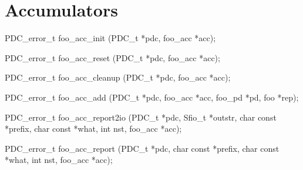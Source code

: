 \chapter{Accumulators}
\label{chap:accumulators}
\begin{code}
PDC_error_t foo_acc_init (PDC_t *pdc, foo_acc *acc);

PDC_error_t foo_acc_reset (PDC_t *pdc, foo_acc *acc);

PDC_error_t foo_acc_cleanup (PDC_t *pdc, foo_acc *acc);

PDC_error_t foo_acc_add (PDC_t *pdc, foo_acc *acc, foo_pd *pd, foo *rep);

PDC_error_t foo_acc_report2io (PDC_t *pdc, Sfio_t *outstr, 
                               char const *prefix, char const *what, 
                               int nst, foo_acc *acc);

PDC_error_t foo_acc_report (PDC_t *pdc, char const *prefix, 
                            char const *what, int nst, foo_acc *acc);

\end{code}

